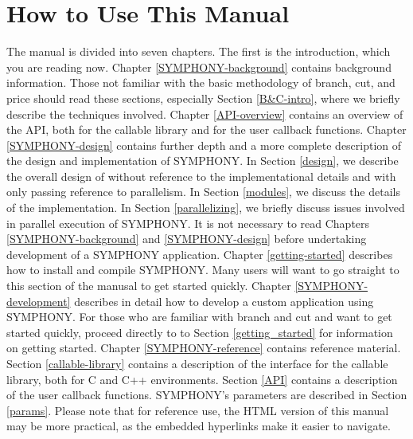\section{How to Use This Manual}

The manual is divided into seven chapters. The first is the introduction,
which you are reading now. Chapter \ref{SYMPHONY-background} contains
background information. Those not familiar with the basic methodology of
branch, cut, and price should read these sections, especially Section
\ref{B&C-intro}, where we briefly describe the techniques involved. Chapter
\ref{API-overview} contains an overview of the API, both for the callable
library and for the user callback functions. Chapter \ref{SYMPHONY-design}
contains further depth and a more complete description of the design and
implementation of SYMPHONY. In Section \ref{design}, we describe the overall
design of without reference to the implementational details and with only
passing reference to parallelism. In Section \ref{modules}, we discuss the
details of the implementation. In Section \ref{parallelizing}, we briefly
discuss issues involved in parallel execution of SYMPHONY. It is not necessary
to read Chapters \ref{SYMPHONY-background} and \ref{SYMPHONY-design} before
undertaking development of a SYMPHONY application. Chapter
\ref{getting-started} describes how to install and compile SYMPHONY. Many
users will want to go straight to this section of the manusal to get started
quickly. Chapter \ref{SYMPHONY-development} describes in detail how to develop
a custom application using SYMPHONY. For those who are familiar with branch
and cut and want to get started quickly, proceed directly to to Section
\ref{getting_started} for information on getting started. Chapter
\ref{SYMPHONY-reference} contains reference material. Section
\ref{callable-library} contains a description of the interface for the
callable library, both for C and C++ environments. Section \ref{API} contains
a description of the user callback functions. SYMPHONY's parameters are
described in Section \ref{params}. Please note that for reference use, the
HTML version of this manual may be more practical, as the embedded hyperlinks
make it easier to navigate.
